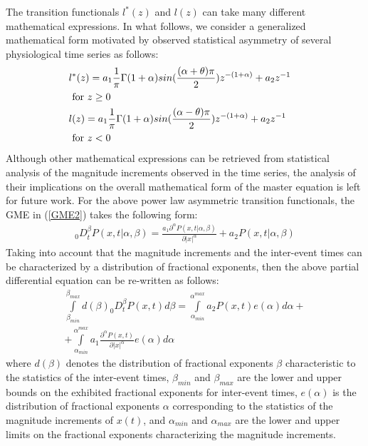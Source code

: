 The transition functionals $l^{*}(z)$ and $l(z)$ can take many different mathematical expressions. In what follows, we consider a generalized mathematical form motivated by observed statistical asymmetry of several physiological time series as follows: 
\begin{eqnarray}
&l^{*}(z) = a_{1} \frac{1}{\pi} \Gamma(1+\alpha) sin(\frac{(\alpha+\theta)\pi}{2})z^{-(1+\alpha)} + a_{2} z^{-1}  &\nonumber\\
& \mbox{ for } z \geq 0 \hspace{1mm} &\\
&l(z) = a_{1} \frac{1}{\pi} \Gamma(1+\alpha) sin(\frac{(\alpha-\theta)\pi}{2})z^{-(1+\alpha)}  + a_{2} z^{-1} &\nonumber\\
 & \mbox{ for } z < 0 &
\end{eqnarray}
Although other mathematical expressions can be retrieved from statistical analysis of the magnitude increments observed in the time series, the analysis of their implications on the overall mathematical form of the master equation is left for future work. For the above power law asymmetric transition functionals, the GME in (\ref{GME2}) takes the following form:
\begin{eqnarray}
\label{GME2}
& _{0}D_{t}^{\beta} P(x,t | \alpha, \beta) = \frac{\displaystyle a_{1}\partial^{\alpha} P(x,t | \alpha, \beta)}{\displaystyle\partial |x|^{\alpha}}+ a_{2} P(x,t | \alpha, \beta) & 
\end{eqnarray}
Taking into account that the magnitude increments and the inter-event times can be characterized by a distribution of fractional exponents, then the above partial differential equation can be re-written as follows:
\begin{eqnarray}
\label{PDE}
& \int\limits_{\beta_{min}}^{\beta_{max}} d(\beta) _{0}D_{t}^{\beta} P(x,t)d\beta = \int\limits_{\alpha_{min}}^{\alpha^{max}}  a_{2} P(x,t) e(\alpha) d\alpha + & \nonumber\\
& + \int\limits_{\alpha_{min}}^{\alpha^{max}}  a_{1} \frac{\displaystyle \partial^{\alpha} P(x,t)}{\displaystyle\partial |x|^{\alpha}} e(\alpha) d\alpha &
\end{eqnarray}
where $d(\beta)$ denotes the distribution of fractional exponents $\beta$ characteristic to the statistics of the inter-event times, $\beta_{min}$ and $\beta_{max}$ are the lower and upper bounds on the exhibited fractional exponents for inter-event times, $e(\alpha)$ is the distribution of fractional exponents $\alpha$ corresponding to the statistics of the magnitude increments of $x(t)$, and $\alpha_{min}$ and $\alpha_{max}$ are the lower and upper limits on the fractional exponents characterizing the magnitude increments. 

